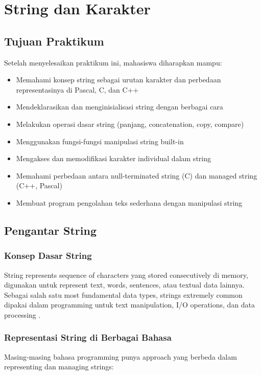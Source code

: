 \documentclass[../main.tex]{subfiles}
\begin{document}
\chapter{String dan Karakter}

\section*{Tujuan Praktikum}
Setelah menyelesaikan praktikum ini, mahasiswa diharapkan mampu:
\begin{itemize}
  \item Memahami konsep string sebagai urutan karakter dan perbedaan representasinya di Pascal, C, dan C++
  \item Mendeklarasikan dan menginisialisasi string dengan berbagai cara
  \item Melakukan operasi dasar string (panjang, concatenation, copy, compare)
  \item Menggunakan fungsi-fungsi manipulasi string built-in
  \item Mengakses dan memodifikasi karakter individual dalam string
  \item Memahami perbedaan antara null-terminated string (C) dan managed string (C++, Pascal)
  \item Membuat program pengolahan teks sederhana dengan manipulasi string
\end{itemize}

\section{Pengantar String}

\subsection{Konsep Dasar String}
String represents sequence of characters yang stored consecutively di memory, digunakan untuk represent text, words, sentences, atau textual data lainnya. Sebagai salah satu most fundamental data types, strings extremely common dipakai dalam programming untuk text manipulation, I/O operations, dan data processing \parencite{pascal-tutorial-wikibooks,iso-c-draft-n1570,cpp-strings,tutorialspoint-c-strings}.

\subsection{Representasi String di Berbagai Bahasa}

Masing-masing bahasa programming punya approach yang berbeda dalam representing dan managing strings:
\end{document}

